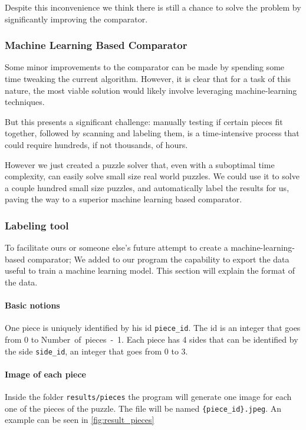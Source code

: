 \documentclass{article}
\begin{document}
Despite this inconvenience we think there is still a chance to solve
the problem by significantly improving the comparator.

\subsubsection{Machine Learning Based Comparator}

Some minor improvements to the comparator can be made by spending some time
tweaking the current algorithm.
However, it is clear that for a task of this nature,
the most viable solution would likely involve
leveraging machine-learning techniques.

But this presents a significant challenge: manually testing if certain
pieces fit together, followed by scanning and labeling them,
is a time-intensive process that could require hundreds,
if not thousands, of hours.

However we just created a puzzle solver that, even with a suboptimal
time complexity, can easily solve small size real world puzzles.
We could use it to solve a couple hundred small size puzzles,
and automatically label the results for us,
paving the way to a superior machine learning based comparator.

\subsubsection{Labeling tool}

To facilitate ours or someone else's future attempt to create a 
machine-learning-based comparator;
We added to our program the capability to export the data useful
to train a machine learning model.
This section will explain the format of the data.

\paragraph{Basic notions}

One piece is uniquely identified by his id \texttt{piece\_id}.
The id is an integer that goes from 0 to \mbox{Number of pieces - 1}.
Each piece has 4 sides that can be identified by the side \texttt{side\_id},
an integer that goes from 0 to 3.

\paragraph{Image of each piece}

Inside the folder \texttt{results/pieces} the program will generate one image
for each one of the pieces of the puzzle. The file will be named \texttt{\{piece\_id\}.jpeg}.
An example can be seen in \cref{fig:result_pieces}
\end{document}
